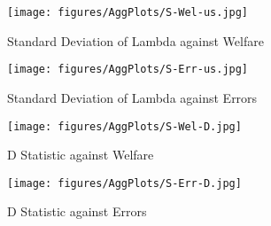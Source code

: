 \documentclass[11pt,a4paper]{article} %
\providecommand{\DIFaddbegin}{} %
\providecommand{\DIFaddend}{} %
\providecommand{\DIFdelbegin}{} %
\providecommand{\DIFdelend}{} %
\newcommand{\DIFscaledelfig}{0.5}
\newlength{\DIFdelgraphicswidth} %
\newlength{\DIFdelgraphicsheight} %
\newcommand{\DIFaddincludegraphics}[2][]{{\color{blue}\fbox{\DIFOincludegraphics[#1]{#2}}}} %
\newcommand{\DIFdelincludegraphics}[2][]{%
\sbox{\DIFdelgraphicsbox}{\DIFOincludegraphics[#1]{#2}}%
\settoboxwidth{\DIFdelgraphicswidth}{\DIFdelgraphicsbox} %
\settoboxtotalheight{\DIFdelgraphicsheight}{\DIFdelgraphicsbox} %
\scalebox{\DIFscaledelfig}{%
\parbox[b]{\DIFdelgraphicswidth}{\usebox{\DIFdelgraphicsbox}\\[-\baselineskip] \rule{\DIFdelgraphicswidth}{0em}}\llap{\resizebox{\DIFdelgraphicswidth}{\DIFdelgraphicsheight}{%
\setlength{\unitlength}{\DIFdelgraphicswidth}%
\begin{picture}(1,1)%
\thicklines\linethickness{2pt} %
{\color[rgb]{1,0,0}\put(0,0){\framebox(1,1){}}}%
{\color[rgb]{1,0,0}\put(0,0){\line( 1,1){1}}}%
{\color[rgb]{1,0,0}\put(0,1){\line(1,-1){1}}}%
\end{picture}%
}\hspace*{3pt}}} %
} %
\DeclareRobustCommand{\DIFaddbegin}{\DIFOaddbegin \let\includegraphics\DIFaddincludegraphics} %
\DeclareRobustCommand{\DIFaddend}{\DIFOaddend \let\includegraphics\DIFOincludegraphics} %
\DeclareRobustCommand{\DIFdelbegin}{\DIFOdelbegin \let\includegraphics\DIFdelincludegraphics} %
\DeclareRobustCommand{\DIFdelend}{\DIFOaddend \let\includegraphics\DIFOincludegraphics} %
\begin{document}
\begin{figure}[hp!]
	\center
	\caption{Standard Deviation of Lambda against Welfare}
	\texttt{[image: figures/AggPlots/S-Wel-us.jpg]}
	\label{fig:S-Wel-us}
\end{figure}

\begin{figure}[hp!]
	\center
	\caption{Standard Deviation of Lambda against Errors}
	\texttt{[image: figures/AggPlots/S-Err-us.jpg]}
	\label{fig:S-Err-us}
\end{figure}

\begin{figure}[hp!]
	\center
	\caption{D Statistic against Welfare}
	\texttt{[image: figures/AggPlots/S-Wel-D.jpg]}
	\label{fig:D-Wel-smooth}
\end{figure}

\begin{figure}[hp!]
	\center
	\caption{D Statistic against Errors}
	\texttt{[image: figures/AggPlots/S-Err-D.jpg]}
	\label{fig:D-Err-smooth}
\end{figure}

\newpage

\DIFdelbegin %
\DIFdelend \DIFaddbegin \printbibliography
\DIFaddend 
\end{document}
